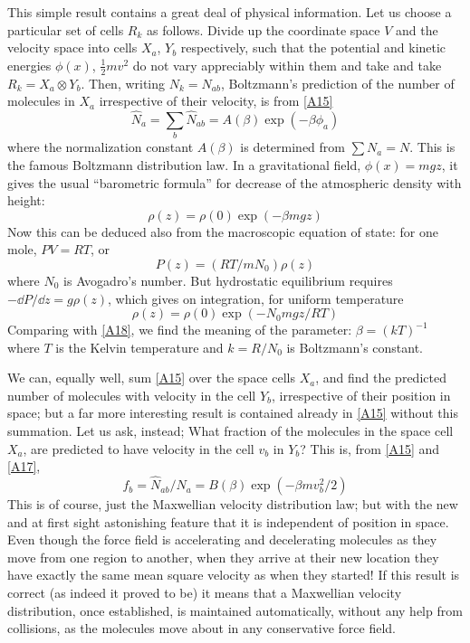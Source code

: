 This simple result contains a great deal of physical information.
Let us choose a particular set of cells $R_k$ as follows.
Divide up the coordinate space $V$ and the velocity space into cells $X_a$, $Y_b$ respectively, such that the potential and kinetic energies $\phi(x)$, $\frac{1}{2}mv^2$ do not vary appreciably within them and take and take $R_k = X_a \otimes Y_b$.
Then, writing $N_k= N_{ab}$, Boltzmann's prediction of the number of molecules in $X_a$ irrespective of their velocity, is from \eqref{A15}
\begin{equation}
	\label{A17}
	\hat{N}_a = \sum_{b}\hat{N}_{ab} = A(\beta) \exp(-\beta\phi_a)
\end{equation}
where the normalization constant $A(\beta)$ is determined from $\sum N_a = N$.
This is the famous Boltzmann distribution law.
In
a gravitational field, $\phi(x) = mgz$, it gives the usual ``barometric formula'' for decrease of the atmospheric density with height:
\begin{equation}
	\label{A18}
	\rho(z) = \rho(0) \exp(-\beta mgz)
\end{equation}
Now this can be deduced also from the macroscopic equation of state: for one mole, $PV=RT$, or
\begin{equation*}
	P(z) = (RT/mN_0)\rho(z)
\end{equation*}
where $N_0$ is Avogadro's number.
But hydrostatic equilibrium requires $-\dd P/\dd z = g\rho(z)$, which gives on integration, for uniform temperature
\begin{equation*}
	\rho(z) = \rho(0) \exp(-N_0 mgz/RT)
\end{equation*}
Comparing with \eqref{A18}, we find the meaning of the parameter: $\beta = (kT)^{-1}$ where $T$ is the Kelvin temperature and $k = R/N_0$ is Boltzmann's constant.

We can, equally well, sum \eqref{A15} over the space cells $X_a$, and find the predicted number of molecules with velocity in the cell $Y_b$, irrespective of their position in space; but a far more interesting result is contained already in \eqref{A15} without this summation.
Let us ask, instead; What fraction of the molecules in the space cell $X_a$, are predicted to have velocity in the cell $v_b$ in $Y_b$? This is, from \eqref{A15} and \eqref{A17},
\begin{equation}
	\label{A20} %
	f_b = \hat{N}_{ab}/\hat{N}_a = B(\beta) \exp (-\beta mv^2_b/2)
\end{equation}
This is  of course, just the Maxwellian velocity distribution law; but with the new and at first sight astonishing feature that it is independent of position in space.
Even though the force field is accelerating and decelerating molecules as they move from one region to another, when they arrive at their new location they have exactly the same mean square velocity as when they started!
If this result is correct (as indeed it proved to be) it means that a Maxwellian velocity distribution, once established, is maintained automatically, without any help from collisions, as the molecules move about in any conservative force field.

